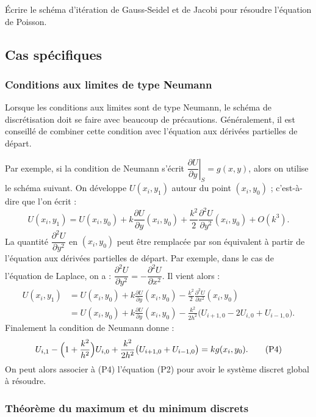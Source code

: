 \begin{exercice}
Écrire le schéma d'itération de Gauss-Seidel et de Jacobi pour résoudre
l'équation de Poisson.
\end{exercice}

\subsection{Cas spécifiques}

\subsubsection{Conditions aux limites de type Neumann}

Lorsque les conditions aux limites sont de type Neumann, le schéma de
discrétisation doit se faire avec beaucoup de précautions. Généralement, il
est conseillé de combiner cette condition avec l'équation aux dérivées
partielles de départ.

Par exemple, si la condition de Neumann s'écrit
$\left.\dfrac{\partial U}{\partial y}\right|_S = g(x, y)$, alors on utilise le
schéma suivant. On développe $U(x_i, y_1)$ autour du point $(x_i, y_0)$ ;
c'est-à-dire que l'on écrit :
\[
  U(x_i, y_1) = U(x_i, y_0) + k\frac{\partial U}{\partial y}(x_i, y_0)
  + \frac{k^2}{2}\frac{\partial^2 U}{\partial y^2}(x_i, y_0) + O(k^3) .
\]
La quantité $\dfrac{\partial^2 U}{\partial y^2}$ en $(x_i, y_0)$ peut être
remplacée par son équivalent à partir de l'équation aux dérivées partielles
de départ. Par exemple, dans le cas de l'équation de Laplace, on a :
$\dfrac{\partial^2 U}{\partial y^2} = -\dfrac{\partial^2 U}{\partial x^2}$.
Il vient alors :
\[
  \begin{aligned}
    U(x_i, y_1) &= U(x_i, y_0) + k\frac{\partial U}{\partial y}(x_i, y_0)
                 - \frac{k^2}{2}\frac{\partial^2 U}{\partial x^2}(x_i, y_0)\\
                &= U(x_i, y_0) + k\frac{\partial U}{\partial y}(x_i, y_0)
                 - \frac{k^2}{2h^2}\bigl(U_{i+1,0} - 2U_{i,0} + U_{i-1,0}\bigr).
  \end{aligned}
\]
Finalement la condition de Neumann donne :
\begin{equation}
  U_{i,1} - \Bigl(1 + \frac{k^2}{h^2}\Bigr)U_{i,0}
  + \frac{k^2}{2h^2}\bigl(U_{i+1,0} + U_{i-1,0}\bigr) = kg(x_i, y_0) .
  \tag{P4}
\end{equation}
On peut alors associer à (P4) l'équation (P2) pour avoir le système discret
global à résoudre.

\subsubsection{Théorème du maximum et du minimum discrets}

